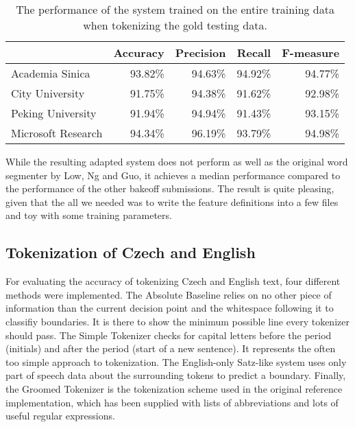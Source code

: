 \begin{table}
  \begin{center}
    \begin{tabular}{ | l | r | r | r | r | }
      \hline
      & Accuracy & Precision & Recall & F-measure \\ \hline
      Academia Sinica & 93.82\% & 94.63\% & 94.92\% & 94.77\% \\ \hline
      City University & 91.75\% & 94.38\% & 91.62\% & 92.98\% \\ \hline
      Peking University & 91.94\% & 94.94\% & 91.43\% & 93.15\% \\ \hline
      Microsoft Research & 94.34\% & 96.19\% & 93.79\% & 94.98\% \\
      \hline
    \end{tabular}
  \end{center}
  \caption[Final performance of Chinese segmenter]{The performance of the system trained on the entire training data
           when tokenizing the gold testing data.}
  \label{tbl:bakeoff-final}
\end{table}

While the resulting adapted system does not perform as well as the original
word segmenter by Low, Ng and Guo, it achieves a median performance compared to
the performance of the other bakeoff submissions. The result is quite pleasing,
given that the all we needed was to write the feature definitions into a few
files and toy with some training parameters.

\subsection{Tokenization of Czech and English}
\label{ssec:eval-acc-eng}

For evaluating the accuracy of tokenizing Czech and English text, four
different methods were implemented. The Absolute Baseline relies on no other
piece of information than the current decision point and the whitespace
following it to classifiy boundaries. It is there to show the minimum possible
line every tokenizer should pass. The Simple Tokenizer checks for capital
letters before the period (initials) and after the period (start of a new
sentence). It represents the often too simple approach to tokenization. The
English-only Satz-like system uses only part of speech data about the
surrounding tokens to predict a boundary. Finally, the Groomed Tokenizer is the
tokenization scheme used in the original reference implementation, which has
been supplied with lists of abbreviations and lots of useful regular
expressions.

